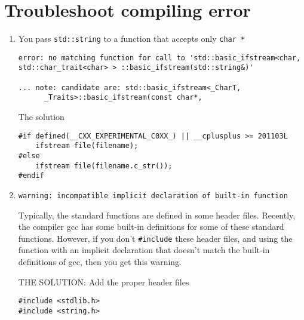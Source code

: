 \chapter{Troubleshoot compiling error}

\begin{enumerate}
  \item You pass \verb!std::string! to a function that accepts only \verb!char *!
\begin{verbatim}
error: no matching function for call to 'std::basic_ifstream<char,
std::char_trait<char> > ::basic_ifstream(std::string&)'

... note: candidate are: std::basic_ifstream<_CharT,
      _Traits>::basic_ifstream(const char*,
\end{verbatim}  
The solution
\begin{verbatim}
#if defined(__CXX_EXPERIMENTAL_C0XX_) || __cplusplus >= 201103L
	ifstream file(filename);
#else
	ifstream file(filename.c_str());
#endif	
\end{verbatim}


   \item \verb!warning: incompatible implicit declaration of built-in function!
   
Typically, the standard functions are defined in some header files. Recently, 
the compiler gcc has some built-in definitions for some of these standard
functions. However, if you don't \verb!#include! these header files, and using
the function with an implicit declaration that doesn't match the built-in
definitions of gcc, then you get this warning. 

THE SOLUTION: Add the proper header files
\begin{verbatim}
#include <stdlib.h>
#include <string.h>
\end{verbatim}


\end{enumerate}